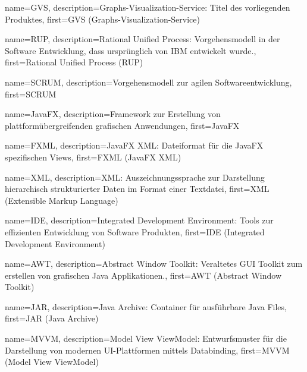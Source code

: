 



{
	name={GVS},
	description={Graphs-Visualization-Service: Titel des vorliegenden Produktes},
	first={GVS (Graphs-Visualization-Service)}
}

{
	name={RUP},
	description={Rational Unified Process: Vorgehensmodell in der Software Entwicklung, dass ursprünglich von IBM entwickelt wurde.},
	first={Rational Unified Process (RUP)}
}

{
	name={SCRUM},
	description={Vorgehensmodell zur agilen Softwareentwicklung},
	first={SCRUM}
}

{
	name={JavaFX},
	description={Framework zur Erstellung von plattformübergreifenden grafischen Anwendungen},
	first={JavaFX}
}

{
	name={FXML},
	description={JavaFX XML: Dateiformat für die JavaFX spezifischen Views},
	first={FXML (JavaFX XML)}
}

{
	name={XML},
	description={XML: Auszeichnungssprache zur Darstellung hierarchisch strukturierter Daten im Format einer Textdatei},
	first={XML (Extensible Markup Language)}
}

{
	name={IDE},
	description={Integrated Development Environment: Tools zur effizienten Entwicklung von Software Produkten},
	first={IDE (Integrated Development Environment)}
}

{
	name={AWT},
	description={Abstract Window Toolkit: Veraltetes GUI Toolkit zum erstellen von grafischen Java Applikationen.},
	first={AWT (Abstract Window Toolkit)}
}

{
	name={JAR},
	description={Java Archive: Container für ausführbare Java Files},
	first={JAR (Java Archive)}
}

{
	name={MVVM},
	description={Model View ViewModel: Entwurfsmuster für die Darstellung von modernen UI-Plattformen mittels Databinding},
	first={MVVM (Model View ViewModel)}
}


